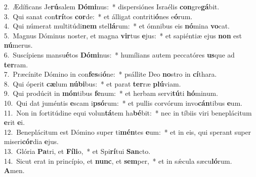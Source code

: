 {2.~}Ædíficans Je\textbf{rú}salem \textbf{Dó}\textbf{mi}nus:~* dispersiónes Israélis \textbf{con}gre\textbf{gá}bit.\\
{3.~}Qui sanat con\textbf{trí}tos \textbf{cor}de:~* et álligat contriti\textbf{ó}nes e\textbf{ó}rum.\\
{4.~}Qui númerat multitúdi\textbf{nem} stel\textbf{lá}rum:~* et ómnibus eis \textbf{nó}mina \textbf{vo}cat.\\
{5.~}Magnus Dóminus noster, et magna \textbf{vir}tus \textbf{e}jus:~* et sapiéntiæ ejus \textbf{non} est \textbf{nú}merus.\\
{6.~}Suscípiens mansu\textbf{é}tos \textbf{Dó}\textbf{mi}nus:~* humílians autem peccatóres \textbf{us}que ad \textbf{ter}ram.\\
{7.~}Præcínite Dómino in con\textbf{fes}si\textbf{ó}ne:~* psállite Deo \textbf{no}stro in \textbf{cí}thara.\\
{8.~}Qui óperit \textbf{cæ}lum \textbf{nú}\textbf{bi}bus:~* et parat \textbf{ter}ræ \textbf{plú}viam.\\
{9.~}Qui prodúcit in \textbf{món}tibus \textbf{fe}num:~* et herbam servi\textbf{tú}ti \textbf{hó}minum.\\
{10.~}Qui dat juméntis \textbf{e}scam i\textbf{psó}rum:~* et pullis corvórum invo\textbf{cán}tibus \textbf{e}um.\\
{11.~}Non in fortitúdine equi volun\textbf{tá}tem ha\textbf{bé}bit:~* nec in tíbiis viri beneplácitum \textbf{e}rit \textbf{e}i.\\
{12.~}Beneplácitum est Dómino super ti\textbf{mén}tes \textbf{e}um:~* et in eis, qui sperant super miseri\textbf{cór}dia \textbf{e}jus.\\
{13.~}Glória \textbf{Pa}tri, et \textbf{Fí}\textbf{li}o,~* et Spi\textbf{rí}tui \textbf{San}cto.\\
{14.~}Sicut erat in princípio, et \textbf{nunc}, et \textbf{sem}per,~* et in sǽcula sæcu\textbf{ló}rum. \textbf{A}men.\\
